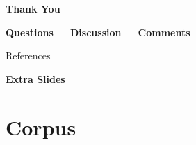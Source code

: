 \documentclass[en,16:9,smallfoot]{sdqbeamer}
\begin{document}
   \begin{frame}[plain]
        \centering

        \vspace{0.7cm}
        \begin{Huge}
        \textbf{Thank You \faSmileO}\\
        \end{Huge}

        \vspace{0.7cm}
        \begin{Large}
        \textbf{Questions~~~Discussion~~~Comments}\\
        \end{Large}
   \end{frame}

   \begin{frame}[allowframebreaks]{References}
   \footnotesize
   \printbibliography
   \end{frame}

   \appendix

   \begin{frame}[plain]
        \vspace{0.7cm}
        \begin{infobox-map}
        \centering
        \begin{Huge}
        \textbf{Extra Slides}\\
        \end{Huge}
        \end{infobox-map}
   \end{frame}

\section{Corpus}
\end{document}
